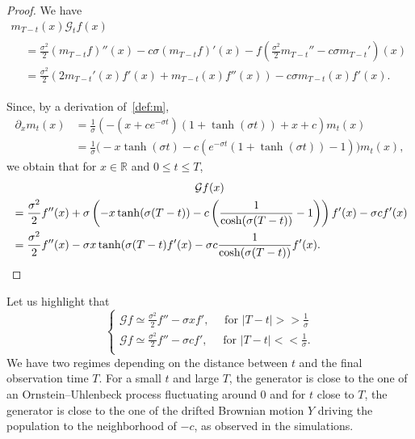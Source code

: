 \documentclass[AHL,Unicode,longabstracts,published]{cedram}
\newcommand{\Go}{\mathcal{G}}
\newcommand*\R{\mathbb{R}}
\begin{document}
\begin{proof}
We have
\begin{multline*}
m_{T-t}(x) \Go_{t}f(x)\\
\begin{aligned}
&= \frac{\sigma^2}{2} \left(m_{T-t} f\right)''(x) - c \sigma \left(m_{T-t} f\right)'(x) - f \left(\frac{\sigma^2}{2}m_{T-t}'' - c \sigma m_{T-t} ' \right)(x)\\
&= \frac{\sigma^2}{2} \left(2 m_{T-t}'(x) f'(x) + m_{T-t}(x) f''(x) \right)- c \sigma m_{T-t}(x) f'(x).
\end{aligned}
\end{multline*}

Since, by a derivation of~\eqref{def:m},
\begin{align*}
\partial_{x}m_{t}(x)
&=\frac{1}{\sigma}\left(-\left(x +c e^{-\sigma t}\right)(1+\tanh(\sigma t))+ x+c\right)m_{t}(x)\\
&=\frac{1}{\sigma}\Big(- x\tanh(\sigma t)-c\left(e^{-\sigma t}(1+\tanh(\sigma t))-1 \right)\Big)m_{t}(x),
\end{align*}
we obtain that for $x\in \R$ and $0\le t\le T$,
\begin{multline*}
\Go f(x)\\
\begin{aligned}
&=\frac{\sigma^2}{2}f''(x)+\sigma\left(- x\tanh(\sigma (T-t))- c \left(\frac{1}{\cosh(\sigma (T-t))} - 1\right)\right)f'(x)-\sigma cf'(x)\\
&=\frac{\sigma^2}{2}f''(x)- \sigma x\tanh(\sigma (T-t)f'(x) - \sigma c \frac{1}{\cosh(\sigma (T-t))}f'(x).\qedhere
\end{aligned}
\end{multline*}
\end{proof}

Let us highlight that
\[
\begin{cases}
\Go f\simeq
\frac{\sigma^2}{2}f''-\sigma xf', \quad \text{ for } |T-t|>>\frac{1}{\sigma}\\
\Go f\simeq
\frac{\sigma^2}{2}f''-\sigma cf', \quad \text{ for } |T-t|<<\frac{1}{\sigma}.\\
\end{cases}
\]
We have two regimes depending on the distance between $t$ and the final observation time $T$. For a small $t$ and large $T$, the generator is close to the one of an Ornstein--Uhlenbeck process fluctuating around $0$ and for $t$ close to $T$, the generator is close to the one of the drifted Brownian motion $Y$ driving the population to the neighborhood of $-c$, as observed in the simulations.
\end{document}

